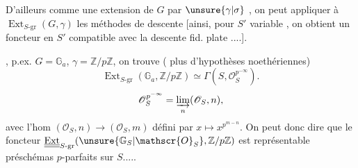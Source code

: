 
D'ailleurs  comme une extension de $G$ par $\unsure{\gamma|\sigma}$ , on peut appliquer à $\operatorname{Ext}_{S\text{-gr}}(G,\gamma)$ les méthodes de descente [ainsi, pour $S'$ variable , on obtient un foncteur en $S'$ compatible avec la descente fid. plate ....].

, p.ex. $G=\mathbb{G}_a$, $\gamma=\mathbb{Z}/p\mathbb{Z}$, on trouve (  plus d'hypothèses noethériennes)
\[
\operatorname{Ext}_{S\text{-gr}}(\mathbb{G}_a,\mathbb{Z}/p\mathbb{Z})\simeq\Gamma(S,\mathscr{O}_S^{p^{-\infty}}).
\]
\[
\mathscr{O}_S^{p^{-\infty}}=\varinjlim_n(\mathscr{O}_S,n),
\]
avec l'hom $(\mathscr{O}_S,n)\longrightarrow(\mathscr{O}_S,m)$ défini par $x\longmapsto x^{p^{m-n}}$. On peut donc dire que le foncteur $\underline{\underline{\operatorname{Ext}}}_{S\text{-gr}}(\unsure{\mathbb{G}_S|\mathscr{O}_S},\mathbb{Z}/p\mathbb{Z})$ est représentable   préschémas $p$-parfaits sur $S$.....
